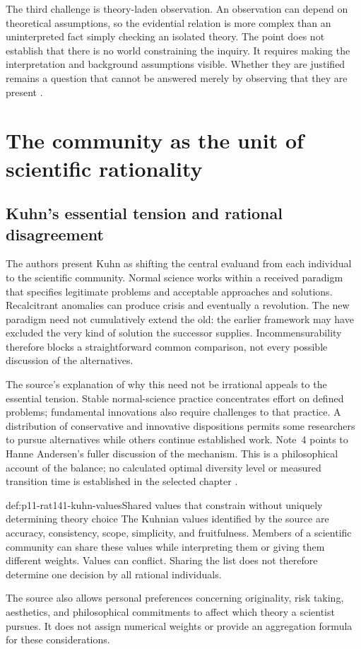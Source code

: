 The third challenge is theory-laden observation. An observation can
depend on theoretical assumptions, so the evidential relation is more
complex than an uninterpreted fact simply checking an isolated theory.
The point does not establish that there is no world constraining the
inquiry. It requires making the interpretation and background
assumptions visible. Whether they are justified remains a question
that cannot be answered merely by observing that they are present
\parencite[pp.~748--749 and p.~753, n.~3]{AndersenAndersen2021Scientific}.

\section{The community as the unit of scientific rationality}
\label{sec:p11-rat141-community-rationality}

\subsection{Kuhn's essential tension and rational disagreement}

The authors present Kuhn as shifting the central evaluand from each
individual to the scientific community. Normal science works within
a received paradigm that specifies legitimate problems and acceptable
approaches and solutions. Recalcitrant anomalies can produce crisis
and eventually a revolution. The new paradigm need not cumulatively
extend the old: the earlier framework may have excluded the very kind
of solution the successor supplies. Incommensurability therefore blocks
a straightforward common comparison, not every possible discussion
of the alternatives.

The source's explanation of why this need not be irrational appeals
to the essential tension. Stable normal-science practice concentrates
effort on defined problems; fundamental innovations also require
challenges to that practice. A distribution of conservative and
innovative dispositions permits some researchers to pursue alternatives
while others continue established work. Note~4 points to Hanne
Andersen's fuller discussion of the mechanism. This is a philosophical
account of the balance; no calculated optimal diversity level or
measured transition time is established in the selected chapter
\parencite[p.~749]{AndersenAndersen2021Scientific}.

\begin{hbdefinition}{def:p11-rat141-kuhn-values}{Shared values that constrain without uniquely determining theory choice}
The Kuhnian values identified by the source are accuracy, consistency,
scope, simplicity, and fruitfulness. Members of a scientific community
can share these values while interpreting them or giving them different
weights. Values can conflict. Sharing the list does not therefore
determine one decision by all rational individuals.

The source also allows personal preferences concerning originality,
risk taking, aesthetics, and philosophical commitments to affect which
theory a scientist pursues. It does not assign numerical weights or
provide an aggregation formula for these considerations.
\end{hbdefinition}

